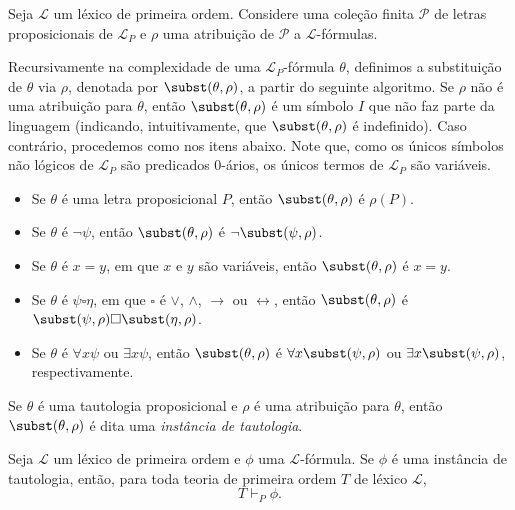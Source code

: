 \begin{metadefinition}\label{mdef:substituicaoProposicionalFO}
   Seja $\mathcal L$ um léxico de primeira ordem.
   Considere uma coleção finita $\mathcal P$ de letras proposicionais de $\mathcal L_P$ e $\rho$ uma atribuição de $\mathcal P$ a $\mathcal L$-fórmulas.

   Recursivamente na complexidade de uma $\mathcal L_P$-fórmula $\theta$, definimos a substituição de $\theta$ via $\rho$, denotada por $\subst(\theta, \rho)$, a partir do seguinte algoritmo.
   Se $\rho$ não é uma atribuição para $\theta$, então $\subst(\theta, \rho)$ é um símbolo $I$ que não faz parte da linguagem (indicando, intuitivamente, que $\subst(\theta, \rho)$ é indefinido).
   Caso contrário, procedemos como nos itens abaixo.
   Note que, como os únicos símbolos não lógicos de $\mathcal L_P$ são predicados $0$-ários, os únicos termos de $\mathcal L_P$ são variáveis.
    \begin{itemize}
        \item Se $\theta$ é uma letra proposicional $P$, então $\subst(\theta, \rho)$ é $\rho(P)$.
        \item Se $\theta$ é $\neg \psi$, então $\subst(\theta, \rho)$ é $\neg \subst(\psi, \rho)$.
        \item Se $\theta$ é $x=y$, em que $x$ e $y$ são variáveis, então $\subst(\theta, \rho)$ é $x=y$.
        \item Se $\theta$ é $\psi \square \eta$, em que $\square$ é $\vee$, $\wedge$, $\rightarrow$ ou $\leftrightarrow$, então $\subst(\theta, \rho)$ é $\subst(\psi, \rho) \square \subst(\eta, \rho)$.
        \item Se $\theta$ é $\forall x \psi$ ou $\exists x \psi$, então $\subst(\theta, \rho)$ é $\forall x \subst(\psi, \rho)$ ou $\exists x \subst(\psi, \rho)$, respectivamente.
    \end{itemize}

    Se $\theta$ é uma tautologia proposicional e $\rho$ é uma atribuição para $\theta$, então $\subst(\theta, \rho)$ é dita uma \emph{instância de tautologia}.
\end{metadefinition}

\begin{metatheorem}
    Seja $\mathcal L$ um léxico de primeira ordem e $\phi$ uma $\mathcal L$-fórmula.
    Se $\phi$ é uma instância de tautologia, então, para toda teoria de primeira ordem $T$ de léxico $\mathcal L$,
    \[
        T\vdash_P \phi.
    \]
\end{metatheorem}

